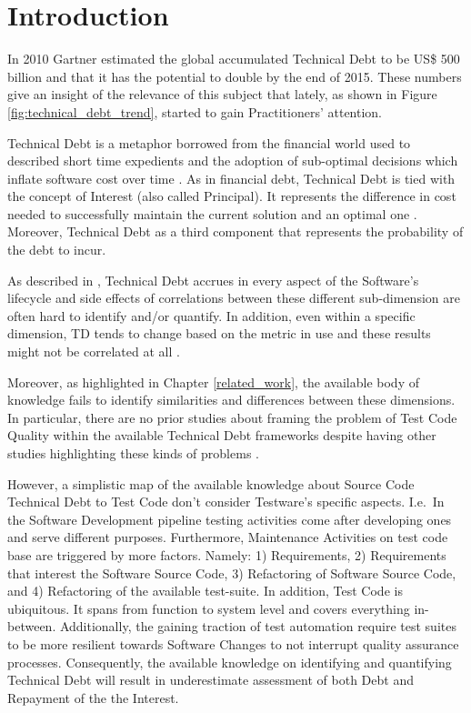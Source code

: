 \chapter{Introduction}

In 2010 Gartner estimated the global accumulated Technical Debt to be US\$ 500 billion \cite{costOfTechnicalDebt} and that it has the potential to double by the end of 2015. These numbers give an insight of the relevance of this subject that lately, as shown in Figure \ref{fig:technical_debt_trend}, started to gain Practitioners' attention.

Technical Debt is a metaphor borrowed from the financial world used to described short time expedients and the adoption of sub-optimal decisions which inflate software cost over time \cite{first_mention_of_TD}. As in financial debt, Technical Debt is tied with the concept of Interest (also called Principal). It represents the difference in cost needed to successfully maintain the current solution and an optimal one \cite{technicalDebtInterest}. Moreover, Technical Debt as a third component that represents the probability of the debt to incur.

As described in \cite{mapping_study_td, exploration_of_td, exploration_of_td2}, Technical Debt accrues in every aspect of the Software's lifecycle and side effects of correlations between these different sub-dimension are often hard to identify and/or quantify. In addition, even within a specific dimension, TD tends to change based on the metric in use and these results might not be correlated at all \cite{4_methods_to_identify_td}.

Moreover, as highlighted in Chapter \ref{related_work}, the available body of knowledge fails to identify similarities and differences between these dimensions. In particular, there are no prior studies about framing the problem of Test Code Quality within the available Technical Debt frameworks despite having other studies highlighting these kinds of problems \cite{gui_scripts_bad_smells,pitfalls_in_introducing_regression_testing}.

However, a simplistic map of the available knowledge about Source Code Technical Debt to Test Code don't consider Testware's specific aspects. I.e.\ In the Software Development pipeline testing activities come after developing ones and serve different purposes. Furthermore, Maintenance Activities on test code base are triggered by more factors. Namely: 1) Requirements, 2) Requirements that interest the Software Source Code, 3) Refactoring of Software Source Code, and 4) Refactoring of the available test-suite. In addition, Test Code is ubiquitous. It spans from function to system level and covers everything in-between. Additionally, the gaining traction of test automation require test suites to be more resilient towards Software Changes to not interrupt quality assurance processes. Consequently, the available knowledge on identifying and quantifying Technical Debt will result in underestimate assessment of both Debt and Repayment of the the Interest.

